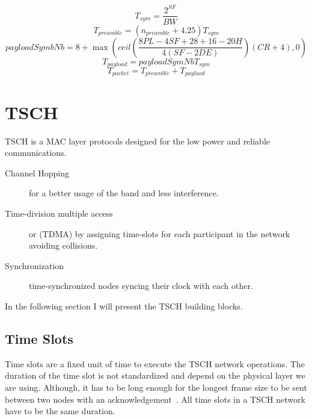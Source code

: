 \begin{equation}
  \label{eq:tsym}
  T_{sym} = \frac{2^{SF}}{BW}
\end{equation}
\begin{equation}
  \label{eq:tpreamble}
  T_{preamble} = (n_{preamble} + 4.25)T_{sym}
\end{equation}
\begin{equation}
  \label{eq:payloadsymnb}
  payloadSymbNb = 8 + \max(ceil(\frac{8PL - 4SF + 28 + 16 - 20H}{4(SF - 2DE)})(CR + 4),0)
\end{equation}
\begin{equation}
  \label{eq:tpayload}
  T_{payload} = payloadSymNb T_{sym}
\end{equation}
\begin{equation}
  \label{eq:tpacket}
  T_{packet} = T_{preamble} + T_{paylaod}
\end{equation}

\section{TSCH}

TSCH is a MAC layer protocols designed for the low power and reliable
communications.

\begin{description}
  \item[Channel Hopping] for a better usage of the band and less interference.
  \item[Time-division multiple access] or (TDMA) by assigning time-slots for each
    participant in the network avoiding collisions.
  \item[Synchronization] time-synchronized nodes syncing their clock with each
    other.
\end{description}

In the following section I will present the TSCH building blocks.

\subsection{Time Slots}

Time slots are a fixed unit of time to execute the TSCH network operations. 
The duration of the time slot is not standardized and depend on the physical 
layer we are using. 
Although, it has to be long enough for the longest frame size to be sent
between two nodes with an acknowledgement~\cite{rfc7554}. 
All time slots in a TSCH network have to be the same duration.

